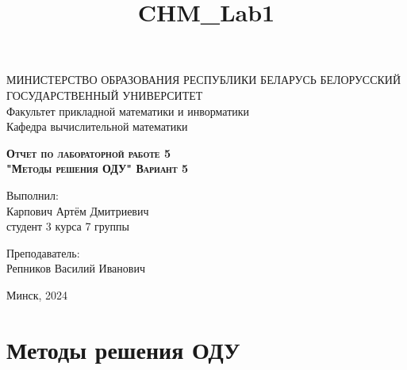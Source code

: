 \documentclass[11pt]{article}
\title{CHM\_Lab1}
\begin{document}
    
    \begin{titlepage}
    \newpage
    
    \begin{center}
    МИНИСТЕРСТВО ОБРАЗОВАНИЯ РЕСПУБЛИКИ БЕЛАРУСЬ БЕЛОРУССКИЙ ГОСУДАРСТВЕННЫЙ УНИВЕРСИТЕТ \\
    Факультет прикладной математики и инворматики \\ Кафедра вычислительной математики
 
    \end{center}
    
    \vspace{8em}
    
    \vspace{2em}
    
    \begin{center}
    \textsc{\textbf{Отчет по лабораторной работе 5 \\ "Методы решения ОДУ" \linebreak Вариант 5}}
    \end{center}
    
    \vspace{6em}
    
    \begin{flushright}
        Выполнил:\\
        Карпович Артём Дмитриевич\\
        студент 3 курса 7 группы
    \end{flushright}
    
    \begin{flushright}
        Преподаватель:\\
        Репников Василий Иванович
    \end{flushright}
    
    \vspace{\fill}
    
    \vspace{\fill}
    
    \begin{center}
    Минск, 2024
    \end{center}
    
    \end{titlepage}
    

    
    \section*{Методы решения
ОДУ}\label{ux43cux435ux442ux43eux434ux44b-ux440ux435ux448ux435ux43dux438ux44f-ux43eux434ux443}
\end{document}
